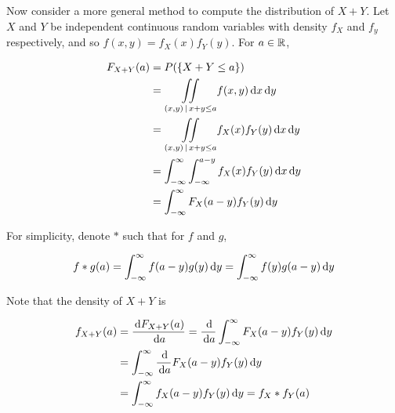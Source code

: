 \documentclass[a4paper,12pt]{article}
\begin{document}
Now consider a more general method to compute the distribution of $X+Y$. Let $X$ and $Y$ be independent continuous random variables with density $f_{X}$ and $f_{y}$ respectively, and so $f(x,y)=f_{X}(x)f_{Y}(y)$. For $a\in\mathbb{R}$,

$$\begin{aligned}
  F_{X+Y}(a)&=P(\left\{ X+Y\leq a\right\})\\
  &=\underset{(x,y)\,\mid\, x+y\leq a}{\iint}f(x,y)\,\mathrm{d} x\,\mathrm{d} y\\
  &=\underset{(x,y)\,\mid\, x+y\leq a}{\iint}f_{X}(x)f_{Y}(y)\,\mathrm{d} x\,\mathrm{d} y\\
  &=\int_{-\infty}^{\infty}\int_{-\infty}^{a-y}f_{X}(x)f_{Y}(y)\,\mathrm{d} x\,\mathrm{d} y\\
  &=\int_{-\infty}^{\infty}F_{X}(a-y)f_{Y}(y)\,\mathrm{d} y
\end{aligned}$$\s

For simplicity, denote $\ast$ such that for $f$ and $g$,

$$f\ast g(a)=\int_{-\infty}^{\infty}f(a-y)g(y)\,\mathrm{d} y=\int_{-\infty}^{\infty}f(y)g(a-y)\,\mathrm{d} y$$\s

Note that the density of $X+Y$ is

$$\begin{aligned}[t]
  f_{X+Y}(a)&=\frac{\,\mathrm{d} F_{X+Y}(a)}{\,\mathrm{d} a}=\frac{\,\mathrm{d}}{\,\mathrm{d} a}\int_{-\infty}^{\infty}F_{X}(a-y)f_{Y}(y)\,\mathrm{d} y\\
  &=\int_{-\infty}^{\infty}\frac{\,\mathrm{d}}{\,\mathrm{d} a}F_{X}(a-y)f_{Y}(y)\,\mathrm{d} y\\
  &=\int_{-\infty}^{\infty}f_{X}(a-y)f_{Y}(y)\,\mathrm{d} y=f_{X}\ast f_{Y}(a)
\end{aligned}$$\s
\end{document}
